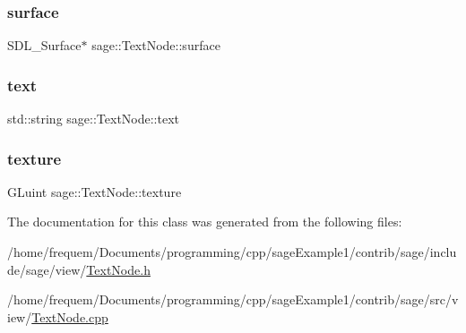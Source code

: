\mbox{\label{classsage_1_1TextNode_a6f15575871c6eef0b1a461aaa1b87ca2}} 
\subsubsection{\texorpdfstring{surface}{surface}}
{\footnotesize\ttfamily S\+D\+L\+\_\+\+Surface$\ast$ sage\+::\+Text\+Node\+::surface\hspace{0.3cm}{\ttfamily [private]}}

\mbox{\label{classsage_1_1TextNode_a2828e281a4ea3cce151de7cc983ca2c0}} 
\subsubsection{\texorpdfstring{text}{text}}
{\footnotesize\ttfamily std\+::string sage\+::\+Text\+Node\+::text\hspace{0.3cm}{\ttfamily [private]}}

\mbox{\label{classsage_1_1TextNode_a8ffd1a92389ec216de154ea9a5b211cc}} 
\subsubsection{\texorpdfstring{texture}{texture}}
{\footnotesize\ttfamily G\+Luint sage\+::\+Text\+Node\+::texture\hspace{0.3cm}{\ttfamily [private]}}



The documentation for this class was generated from the following files\+:\begin{DoxyCompactItemize}
\item 
/home/frequem/\+Documents/programming/cpp/sage\+Example1/contrib/sage/include/sage/view/\mbox{\hyperlink{TextNode_8h}{Text\+Node.\+h}}\item 
/home/frequem/\+Documents/programming/cpp/sage\+Example1/contrib/sage/src/view/\mbox{\hyperlink{TextNode_8cpp}{Text\+Node.\+cpp}}\end{DoxyCompactItemize}
